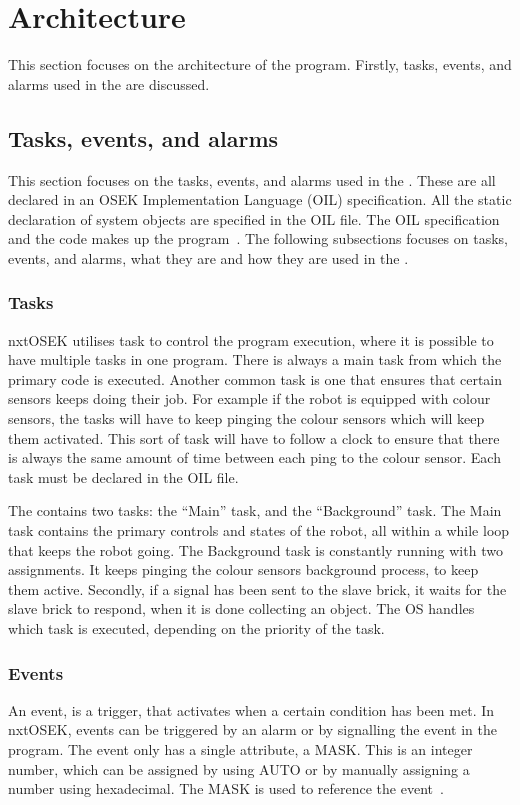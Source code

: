 \section{Architecture} \label{sec:architecture}
This section focuses on the architecture of the program. Firstly, tasks, events, and alarms used in the \projname{} are discussed.

\subsection{Tasks, events, and alarms} \label{sec:task-events-alarms}
This section focuses on the tasks, events, and alarms used in the \projname{}. These are all declared in an OSEK Implementation Language (OIL) specification. All the static declaration of system objects are specified in the OIL file. The OIL specification and the code makes up the program~\citep{nxtOSEK2}. The following subsections focuses on tasks, events, and alarms, what they are and how they are used in the \projname{}.

\subsubsection{Tasks} \label{sec:tasks}
nxtOSEK utilises task to control the program execution, where it is possible to have multiple tasks in one program. There is always a main task from which the primary code is executed. Another common task is one that ensures that certain sensors keeps doing their job. For example if the robot is equipped with colour sensors, the tasks will have to keep pinging the colour sensors which will keep them activated. This sort of task will have to follow a clock to ensure that there is always the same amount of time between each ping to the colour sensor. Each task must be declared in the OIL file. 

The \projname{} contains two tasks: the ``Main'' task, and the ``Background'' task. The Main task contains the primary controls and states of the robot, all within a while loop that keeps the robot going. The Background task is constantly running with two assignments. It keeps pinging the colour sensors background process, to keep them active. Secondly, if a signal has been sent to the slave brick, it waits for the slave brick to respond, when it is done collecting an object. The OS handles which task is executed, depending on the priority of the task. 

\subsubsection{Events} \label{sec:events}
An event, is a trigger, that activates when a certain condition has been met. In nxtOSEK, events can be triggered by an alarm or by signalling the event in the program. The event only has a single attribute, a MASK. This is an integer number, which can be assigned by using AUTO or by manually assigning a number using hexadecimal. The MASK is used to reference the event~\citep{osekoil}. 

